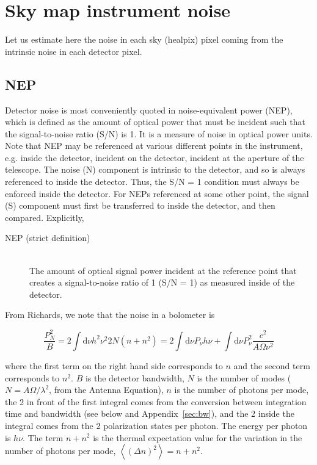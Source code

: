 \documentclass[twoside,10pt]{article}
\title{\doctitle}
\author{\myname}
\newcommand{\Avg}[1]{\left< #1 \right>}
\newcommand{\dd}[0]{\mathrm{d}}
\begin{document}
\maketitle

\section{Sky map instrument noise}
\label{sec:noise}

Let us estimate here the noise in each sky (healpix) pixel coming from the
intrinsic noise in each detector pixel.

\subsection{NEP}
\label{sub:nep}

Detector noise is most conveniently quoted in noise-equivalent power (NEP),
which is defined as the amount of optical power that must be incident such
that the signal-to-noise ratio (S/N) is 1. It is a measure of noise in optical
power units. Note that NEP may be referenced at various different points in
the instrument, e.g. inside the detector, incident on the detector, incident
at the aperture of the telescope. The noise (N) component is intrinsic to the
detector, and so is always referenced to inside the detector. Thus, the S/N =
1 condition must always be enforced inside the detector. For NEPs referenced
at some other point, the signal (S) component must first be transferred to
inside the detector, and then compared. Explicitly,

\begin{description}
    \item[NEP (strict definition)] \hfill \\
    The amount of optical signal power incident at the reference
    point that creates a signal-to-noise ratio of 1 (S/N = 1) as measured
    inside of the detector.
\end{description}

From Richards\cite{richards_bolometers_1994}, we note that the noise in a
bolometer is

\begin{equation}
    \label{eq:noisepower}
    \frac{P_N^2}{B} = 2 \int\dd\nu h^2\nu^2 2N(n + n^2) = 2 \int\dd\nu P_\nu h\nu + \int\dd\nu P_\nu^2 \frac{c^2}{A\Omega \nu^2}
\end{equation}

where the first term on the right hand side corresponds to $n$ and the second
term corresponds to $n^2$. $B$ is the detector bandwidth, $N$ is the number of
modes ($N = A\Omega/\lambda^2$, from the Antenna Equation), $n$ is the number
of photons per mode, the 2 in front of the first integral comes from the
conversion between integration time and bandwidth (see below and
Appendix~\ref{sec:bw}), and the 2 inside the integral comes from the 2
polarization states per photon. The energy per photon is $h\nu$. The term
$n + n^2$ is the thermal expectation value for the variation in the number of
photons per mode, $\Avg{(\Delta n)^2} = n + n^2$.
\end{document}
